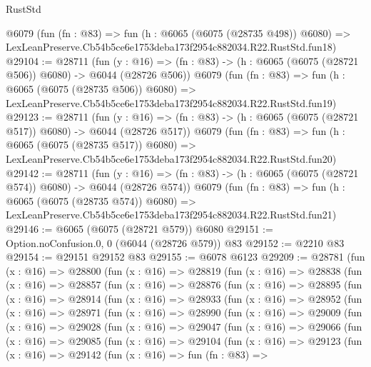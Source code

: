 \begin{lexlean}{RustStd}
\begin{coremodule}
    @6079
    (fun (fn : @83) =>
    fun (h : @6065 (@6075 (@28735 @498)) @6080) =>
    LexLeanPreserve.Cb54b5ce6e1753deba173f2954c882034.R22.RustStd.fun18)
@29104 := @28711
    (fun (y : @16) => (fn : @83) -> (h : @6065 (@6075 (@28721 @506)) @6080) -> @6044 (@28726 @506))
    @6079
    (fun (fn : @83) =>
    fun (h : @6065 (@6075 (@28735 @506)) @6080) =>
    LexLeanPreserve.Cb54b5ce6e1753deba173f2954c882034.R22.RustStd.fun19)
@29123 := @28711
    (fun (y : @16) => (fn : @83) -> (h : @6065 (@6075 (@28721 @517)) @6080) -> @6044 (@28726 @517))
    @6079
    (fun (fn : @83) =>
    fun (h : @6065 (@6075 (@28735 @517)) @6080) =>
    LexLeanPreserve.Cb54b5ce6e1753deba173f2954c882034.R22.RustStd.fun20)
@29142 := @28711
    (fun (y : @16) => (fn : @83) -> (h : @6065 (@6075 (@28721 @574)) @6080) -> @6044 (@28726 @574))
    @6079
    (fun (fn : @83) =>
    fun (h : @6065 (@6075 (@28735 @574)) @6080) =>
    LexLeanPreserve.Cb54b5ce6e1753deba173f2954c882034.R22.RustStd.fun21)
@29146 := @6065 (@6075 (@28721 @579)) @6080
@29151 := Option.noConfusion.{0, 0} (@6044 (@28726 @579)) @83
@29152 := @2210 @83
@29154 := @29151 @29152 @83
@29155 := @6078 @6123
@29209 := @28781
    (fun (x : @16) =>
    @28800
      (fun (x : @16) =>
      @28819
        (fun (x : @16) =>
        @28838
          (fun (x : @16) =>
          @28857
            (fun (x : @16) =>
            @28876
              (fun (x : @16) =>
              @28895
                (fun (x : @16) =>
                @28914
                  (fun (x : @16) =>
                  @28933
                    (fun (x : @16) =>
                    @28952
                      (fun (x : @16) =>
                      @28971
                        (fun (x : @16) =>
                        @28990
                          (fun (x : @16) =>
                          @29009
                            (fun (x : @16) =>
                            @29028
                              (fun (x : @16) =>
                              @29047
                                (fun (x : @16) =>
                                @29066
                                  (fun (x : @16) =>
                                  @29085
                                    (fun (x : @16) =>
                                    @29104
                                      (fun (x : @16) =>
                                      @29123
                                        (fun (x : @16) =>
                                        @29142
                                          (fun (x : @16) =>
                                          fun (fn : @83) =>

\end{coremodule}
\end{lexlean}
